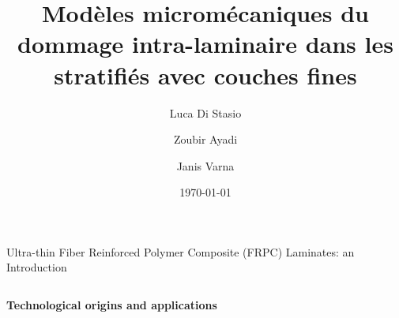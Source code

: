 \documentclass[final]{beamer}
\title{Mod\`eles microm\'ecaniques du dommage intra-laminaire dans les stratifi\'es avec couches fines}
\author{Luca Di Stasio \inst{1,2} \and Zoubir Ayadi \inst{1} \and Janis Varna \inst{2}}
\date{\today}
\begin{document}
\begin{frame}

\begin{center}
\begin{minipage}{\textwidth}
\begin{block}{\rule[-0.6ex]{0pt}{50pt}\centering\LARGE Ultra-thin Fiber Reinforced Polymer Composite (FRPC) Laminates: an Introduction}
\vspace{1cm}
\begin{columns}
\begin{column}{0.4\textwidth}
  \begin{center}
\textbf{Technological origins and applications}
\captionsetup[subfigure]{labelformat=empty}
\begin{figure}[!h]
\centering
   \\[40pt]
\quad
{}

\end{figure}
\end{center}
\end{column}
\end{columns}
\end{block}
\end{minipage}
\end{center}
\end{frame}
\end{document}
